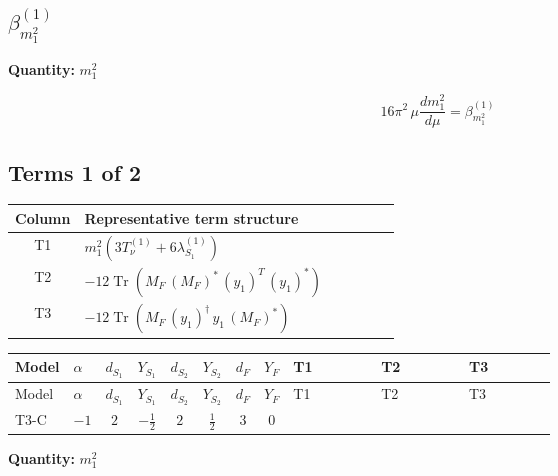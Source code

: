 \documentclass[8pt]{article}
\begin{document}
\begin{landscape}
\section*{$\beta_{m_1^2}^{(1)}$}
\noindent\textbf{Quantity: }$m_1^2$\par\smallskip
\[16\pi^2\,\mu\frac{d m_1^2}{d\mu}=\beta_{m_1^2}^{(1)}\]
\subsection*{Terms 1 of 2}
\begin{center}
\begin{tabular}{@{}c >{\raggedright\arraybackslash}p{0.82\linewidth}@{}}
\toprule
Column & Representative term structure \\
\midrule
T1 & \(\displaystyle {m_1^2} (3 T_{\nu}^{(1)}+6 {\lambda_{S_1}^{(1)}})\) \\
\midrule
T2 & \(\displaystyle -12 \operatorname{Tr}\!\left({M_F}\,\left({M_F}\right)^{*}\,\left({y_1}\right)^{T}\,\left({y_1}\right)^{*}\right)\) \\
\midrule
T3 & \(\displaystyle -12 \operatorname{Tr}\!\left({M_F}\,\left({y_1}\right)^{\dagger}\,{y_1}\,\left({M_F}\right)^{*}\right)\) \\
\midrule
\bottomrule
\end{tabular}
\end{center}
\smallskip
\tiny
\begin{longtable}{@{}llcccccc >{\raggedright\arraybackslash}p{0.21\linewidth} >{\raggedright\arraybackslash}p{0.21\linewidth} >{\raggedright\arraybackslash}p{0.21\linewidth}@{}}
\toprule
Model & $\alpha$ & $d_{S_1}$ & $Y_{S_1}$ & $d_{S_2}$ & $Y_{S_2}$ & $d_F$ & $Y_F$ & T1 & T2 & T3 \\
\midrule
\endfirsthead
\toprule
Model & $\alpha$ & $d_{S_1}$ & $Y_{S_1}$ & $d_{S_2}$ & $Y_{S_2}$ & $d_F$ & $Y_F$ & T1 & T2 & T3 \\
\midrule
\endhead
T3-C & $-1$ & $2$ & $-\frac{1}{2}$ & $2$ & $\frac{1}{2}$ & $3$ & $0$ & \scriptsize\adjustbox{max width=\linewidth}{$\begin{gathered} {m_1^2} (3 T_{\nu}^{(1)}+6 {\lambda_{S_1}^{(1)}})\end{gathered}$} & \scriptsize\adjustbox{max width=\linewidth}{$\begin{gathered} -12 \operatorname{Tr}\!\left({M_F}\,\left({M_F}\right)^{*}\,\left({y_1}\right)^{T}\,\left({y_1}\right)^{*}\right)\end{gathered}$} & \scriptsize\adjustbox{max width=\linewidth}{$\begin{gathered} -12 \operatorname{Tr}\!\left({M_F}\,\left({y_1}\right)^{\dagger}\,{y_1}\,\left({M_F}\right)^{*}\right)\end{gathered}$} \\
\midrule
\bottomrule
\end{longtable}
\clearpage
\noindent\textbf{Quantity: }$m_1^2$\par\smallskip

\end{landscape}
\end{document}
